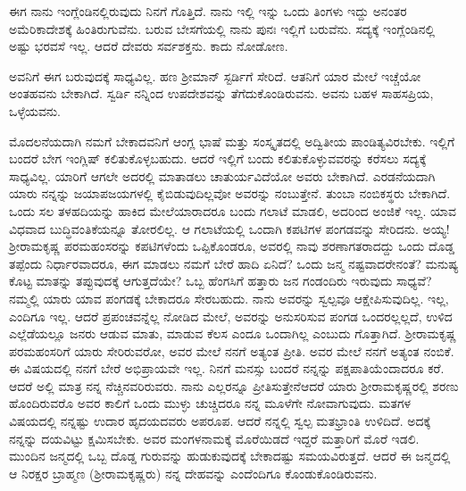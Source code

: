 ಈಗ ನಾನು ಇಂಗ್ಲೆಂಡಿನಲ್ಲಿರುವುದು ನಿನಗೆ ಗೊತ್ತಿದೆ. ನಾನು ಇಲ್ಲಿ ಇನ್ನು ಒಂದು ತಿಂಗಳು ಇದ್ದು ಅನಂತರ ಅಮೆರಿಕಾದೇಶಕ್ಕೆ ಹಿಂತಿರುಗುವೆನು. ಬರುವ ಬೇಸಗೆಯಲ್ಲಿ ನಾನು ಪುನಃ ಇಲ್ಲಿಗೆ ಬರುವೆನು. ಸದ್ಯಕ್ಕೆ ಇಂಗ್ಲೆಂಡಿನಲ್ಲಿ ಅಷ್ಟು ಭರವಸೆ ಇಲ್ಲ. ಆದರೆ ದೇವರು ಸರ್ವಶಕ್ತನು. ಕಾದು ನೋಡೋಣ.

\enginline{-}ಅವನಿಗೆ ಈಗ ಬರುವುದಕ್ಕೆ ಸಾಧ್ಯವಿಲ್ಲ. ಹಣ ಶ‍್ರೀಮಾನ್ ಸ್ಟರ್ಡಿಗೆ ಸೇರಿದೆ. ಆತನಿಗೆ ಯಾರ ಮೇಲೆ ಇಚ್ಚೆಯೋ ಅಂತಹವನು ಬೇಕಾಗಿದೆ. ಸ್ವರ್ಡಿ ನನ್ನಿಂದ ಉಪದೇಶವನ್ನು ತೆಗೆದುಕೊಂಡಿರುವನು. ಅವನು ಬಹಳ ಸಾಹಸಪ್ರಿಯ, ಒಳ್ಳೆಯವನು.

ಮೊದಲನೆಯದಾಗಿ ನಮಗೆ ಬೇಕಾದವನಿಗೆ ಆಂಗ್ಲ ಭಾಷೆ ಮತ್ತು ಸಂಸ್ಕೃತದಲ್ಲಿ ಅದ್ವಿತೀಯ ಪಾಂಡಿತ್ಯವಿರಬೇಕು. ಇಲ್ಲಿಗೆ ಬಂದರೆ ಬೇಗ ಇಂಗ್ಲಿಷ್ ಕಲಿತುಕೊಳ್ಳಬಹುದು. ಆದರೆ ಇಲ್ಲಿಗೆ ಬಂದು ಕಲಿತುಕೊಳ್ಳುವವರನ್ನು ಕರೆಸಲು ಸದ್ಯಕ್ಕೆ ಸಾಧ್ಯವಿಲ್ಲ. ಯಾರಿಗೆ ಆಗಲೇ ಅದರಲ್ಲಿ ಮಾತಾಡಲು ಚಾತುರ್ಯವಿದೆಯೋ ಅವರು ಬೇಕಾಗಿದೆ. ಎರಡನೆಯದಾಗಿ ಯಾರು ನನ್ನನ್ನು ಜಯಾಪಜಯಗಳಲ್ಲಿ ಕೈಬಿಡುವುದಿಲ್ಲವೋ ಅವರನ್ನು ನಂಬುತ್ತೇನೆ. ತುಂಬಾ ನಂಬಿಕಸ್ಥರು ಬೇಕಾಗಿದೆ. ಒಂದು ಸಲ ತಳಹದಿಯನ್ನು ಹಾಕಿದ ಮೇಲೆ\break ಯಾರಾದರೂ ಬಂದು ಗಲಾಟೆ ಮಾಡಲಿ, ಅದರಿಂದ ಅಂಜಿಕೆ ಇಲ್ಲ.\enginline{-} ಯಾವ ವಿಧವಾದ ಬುದ್ಧಿವಂತಿಕೆಯನ್ನೂ ತೋರಲಿಲ್ಲ. ಆ ಗಲಾಟೆಯಲ್ಲಿ ಒಂದಾಗಿ ಕಪಟಿಗಳ ಪಂಗಡವನ್ನು ಸೇರಿದನು. ಅಯ್ಯ! ಶ‍್ರೀರಾಮಕೃಷ್ಣ ಪರಮಹಂಸರನ್ನು ಕಪಟಿಗಳೆಂದು ಒಪ್ಪಿಕೊಂಡರೂ, ಅವರಲ್ಲಿ ನಾವು ಶರಣಾಗತರಾದದ್ದು ಒಂದು ದೊಡ್ಡ ತಪ್ಪೆಂದು ನಿರ್ಧಾರವಾದರೂ, ಈಗ ಮಾಡಲು ನಮಗೆ ಬೇರೆ ಹಾದಿ ಏನಿದೆ? ಒಂದು ಜನ್ಮ ನಷ್ಟವಾದರೇನಂತೆ? ಮನುಷ್ಯ ಕೊಟ್ಟ ಮಾತನ್ನು ತಪ್ಪುವುದಕ್ಕೆ ಆಗುತ್ತದೆಯೇ? ಒಬ್ಬ ಹೆಂಗಸಿಗೆ ಹತ್ತಾರು ಜನ ಗಂಡಂದಿರು ಇರುವುದು ಸಾಧ್ಯವೆ? ನಮ್ಮಲ್ಲಿ ಯಾರು ಯಾವ ಪಂಗಡಕ್ಕೆ ಬೇಕಾದರೂ ಸೇರಬಹುದು. ನಾನು ಅವರನ್ನು ಸ್ವಲ್ಪವೂ ಆಕ್ಷೇಪಿಸುವುದಿಲ್ಲ. ಇಲ್ಲ, ಎಂದಿಗೂ ಇಲ್ಲ. ಆದರೆ ಪ್ರಪಂಚವನ್ನೆಲ್ಲ ನೋಡಿದ ಮೇಲೆ, ಅವರನ್ನು ಅನುಸರಿಸುವ ಪಂಗಡ ಒಂದರಲ್ಲಲ್ಲದೆ, ಉಳಿದ ಎಲ್ಲೆಡೆಯಲ್ಲೂ ಜನರು ಆಡುವ ಮಾತು, ಮಾಡುವ ಕೆಲಸ ಎಂದೂ ಒಂದಾಗಿಲ್ಲ ಎಂಬುದು ಗೊತ್ತಾಗಿದೆ. ಶ‍್ರೀರಾಮಕೃಷ್ಣ ಪರಮಹಂಸರಿಗೆ ಯಾರು ಸೇರಿರುವರೋ, ಅವರ ಮೇಲೆ ನನಗೆ ಅತ್ಯಂತ ಪ್ರೀತಿ. ಅವರ ಮೇಲೆ ನನಗೆ ಅತ್ಯಂತ ನಂಬಿಕೆ. ಈ ವಿಷಯದಲ್ಲಿ ನನಗೆ ಬೇರೆ ಅಭಿಪ್ರಾಯವೇ ಇಲ್ಲ. ನಿನಗೆ ಮನಸ್ಸು ಬಂದರೆ ನನ್ನನ್ನು ಪಕ್ಷ\break ಪಾತಿಯೆಂದಾದರೂ ಕರೆ. ಆದರೆ ಅಲ್ಲಿ ಮಾತ್ರ ನನ್ನ ನೆಚ್ಚಿನವರಿರುವರು. ನಾನು ಎಲ್ಲರನ್ನೂ ಪ್ರೀತಿಸುತ್ತೇನೆ\enginline{-}ಆದರೆ ಯಾರು ಶ‍್ರೀರಾಮಕೃಷ್ಣರಲ್ಲಿ ಶರಣು ಹೊಂದಿರುವರೊ ಅವರ ಕಾಲಿಗೆ ಒಂದು ಮುಳ್ಳು ಚುಚ್ಚಿದರೂ ನನ್ನ ಮೂಳೆಗೇ ನೋವಾಗುವುದು. ಮತಗಳ ವಿಷಯದಲ್ಲಿ ನನ್ನಷ್ಟು ಉದಾರ ಹೃದಯದವರು ಅಪರೂಪ. ಆದರೆ ನನ್ನಲ್ಲಿ ಸ್ವಲ್ಪ ಮತಭ್ರಾಂತಿ ಉಳಿದಿದೆ. ಅದಕ್ಕೆ ನನ್ನನ್ನು ದಯವಿಟ್ಟು ಕ್ಷಮಿಸಬೇಕು. ಅವರ ಮಂಗಳನಾಮಕ್ಕೆ  ಮೊರೆಯಿಡದೆ ಇದ್ದರೆ ಮತ್ತಾರಿಗೆ ಮೊರೆ ಇಡಲಿ. ಮುಂದಿನ ಜನ್ಮದಲ್ಲಿ ಒಬ್ಬ ದೊಡ್ಡ ಗುರುವನ್ನು ಹುಡುಕುವುದಕ್ಕೆ ಬೇಕಾದಷ್ಟು ಸಮಯವಿರುತ್ತದೆ. ಆದರೆ ಈ ಜನ್ಮದಲ್ಲಿ ಆ ನಿರಕ್ಷರ ಬ್ರಾಹ್ಮಣ (ಶ‍್ರೀರಾಮಕೃಷ್ಣರು) ನನ್ನ ದೇಹವನ್ನು ಎಂದೆಂದಿಗೂ ಕೊಂಡುಕೊಂಡಿರುವನು.
\vspace{0.4cm}

